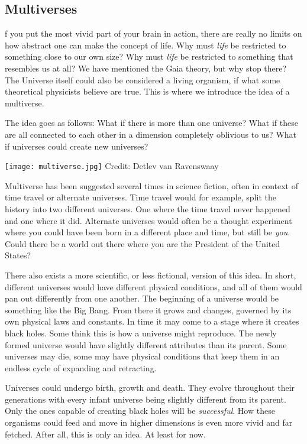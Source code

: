 \subsection{Multiverses}
f you put the most vivid part of your brain in action, there are really no limits on how abstract one can make the concept of life.
Why must \textit{life} be restricted to something close to our own size?
Why must \textit{life} be restricted to something that resembles us at all?
We have mentioned the Gaia theory, but why stop there?
The Universe itself could also be considered a living organism, if what some theoretical physicists believe are true.
This is where we introduce the idea of a multiverse.

The idea goes as follows:
What if there is more than one universe?
What if these are all connected to each other in a dimension completely oblivious to us?
What if universes could create new universes?

\begin{center}
	\texttt{[image: multiverse.jpg]}
	\tiny{Credit: Detlev van Ravenswaay}
\end{center}

Multiverse has been suggested several times in science fiction, often in context of time travel or alternate universes.
Time travel would for example, split the history into two different universes.
One where the time travel never happened and one where it did.
Alternate universes would often be a thought experiment where you could have been born in a different place and time, but still be \textit{you}.
Could there be a world out there where you are the President of the United States?

There also exists a more scientific, or less fictional, version of this idea.
In short, different universes would have different physical conditions, and all of them would pan out differently from one another.
The beginning of a universe would be something like the Big Bang.
From there it grows and changes, governed by its own physical laws and constants.
In time it may come to a stage where it creates black holes.
Some think this is how a universe might reproduce.
The newly formed universe would have slightly different attributes than its parent.
Some universes may die, some may have physical conditions that keep them in an endless cycle of expanding and retracting.

Universes could undergo birth, growth and death.
They evolve throughout their generations with every infant universe being slightly different from its parent.
Only the ones capable of creating black holes will be \textit{successful}.
How these organisms could feed and move in higher dimensions is even more vivid and far fetched.
After all, this is only an idea.
At least for now.